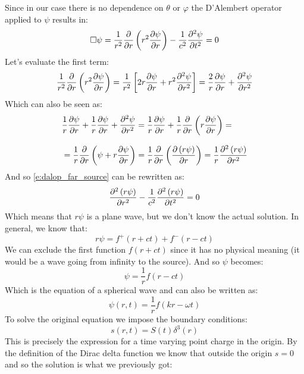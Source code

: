 Since in our case there is no dependence on $\theta$ or $\varphi$ the D'Alembert operator applied to $\psi$ results in:
\begin{equation} \label{e:dalop_far_source}
  \dalop \psi = \dfrac{1}{r^2} \pdv{}{r}\left(r^2 \pdv{\psi}{r}\right) - \dfrac{1}{c^2} \pdv[2]{\psi}{t} = 0
\end{equation}
Let's evaluate the first term:
\begin{equation}
  \dfrac{1}{r^2} \pdv{}{r}\left(r^2 \pdv{\psi}{r}\right) = \dfrac{1}{r^2} \left[2r \pdv{\psi}{r} + r^2 \pdv[2]{\psi}{r}\right] = \dfrac{2}{r} \pdv{\psi}{r} + \pdv[2]{\psi}{r}
\end{equation}
Which can also be seen as:
\begin{equation}
  \begin{split}
    &\dfrac{1}{r} \pdv{\psi}{r} + \dfrac{1}{r} \pdv{\psi}{r} + \pdv[2]{\psi}{r} = \dfrac{1}{r} \pdv{\psi}{r} + \dfrac{1}{r}\pdv{}{r}\brackets{r\pdv{\psi}{r}} = \\[8pt]
    &= \dfrac{1}{r} \pdv{}{r}\brackets{\psi + r\pdv{\psi}{r}} = \dfrac{1}{r}\pdv{}{r}\brackets{\pdv{\brackets{r\psi}}{r}} = \dfrac{1}{r}\pdv[2]{\brackets{r\psi}}{r}
  \end{split}
\end{equation}
And so \eqref{e:dalop_far_source} can be rewritten as:
\begin{equation}
  \pdv[2]{\brackets{r\psi}}{r} - \dfrac{1}{c^2} \pdv[2]{\brackets{r\psi}}{t} = 0
\end{equation}
Which means that $r\psi$ is a plane wave, but we don't know the actual solution. In general, we know that:
\begin{equation}
  r\psi = f^+(r+ct) + f^-(r-ct)
\end{equation}
We can exclude the first function $f(r+ct)$ since it has no physical meaning (it would be a wave going from infinity to the source). And so $\psi$ becomes:
\begin{equation}
  \psi = \dfrac{1}{r} f(r-ct)
\end{equation}
Which is the equation of a spherical wave and can also be written as:
\begin{equation}
  \boxed{\psi(r,t) = \dfrac{1}{r} f(kr - \omega t)}
\end{equation}
To solve the original equation we impose the boundary conditions:
\begin{equation}
  s(r,t) = S(t)\delta^3(r)
\end{equation}
This is precisely the expression for a time varying point charge in the origin. By the definition of the Dirac delta function we know that outside the origin $s=0$ and so the solution is what we previously got:
